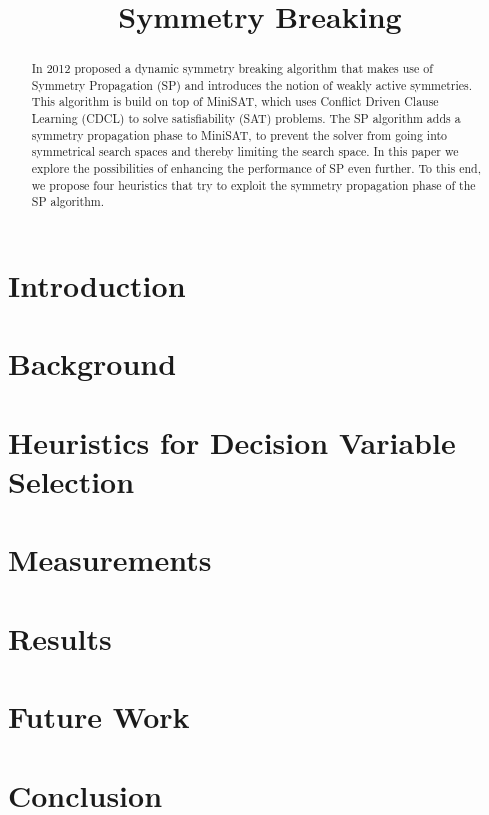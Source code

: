 

\title{Symmetry Breaking}


	\maketitle

	\listoftodos

	\begin{abstract}
	In 2012 \cite{devriendt2012symmetry} proposed a dynamic symmetry breaking algorithm that makes use of Symmetry Propagation (SP) and introduces the notion of weakly active symmetries. This algorithm is build on top of MiniSAT, which uses Conflict Driven Clause Learning (CDCL) to solve satisfiability (SAT) problems. The SP algorithm adds a symmetry propagation phase to MiniSAT, to prevent the solver from going into symmetrical search spaces and thereby limiting the search space. In this paper we explore the possibilities of enhancing the performance of SP even further. To this end, we propose four heuristics that try to exploit the symmetry propagation phase of the SP algorithm.
	\end{abstract}

	\section{Introduction}
		\label{sec:Introduction}
		

	\section{Background}
		\label{sec:Background}
		

	\section{Heuristics for Decision Variable Selection}
		\label{sec:DecisionVars}
		

	\section{Measurements}
		\label{sec:measurements}
		

	\section{Results}
		\label{sec:Results}
		

		
		

	\section{Future Work}
		\label{sec:FutureWork}
		

	\section{Conclusion}
		\label{sec:Conclusion}
		

	\newpage
	
	

